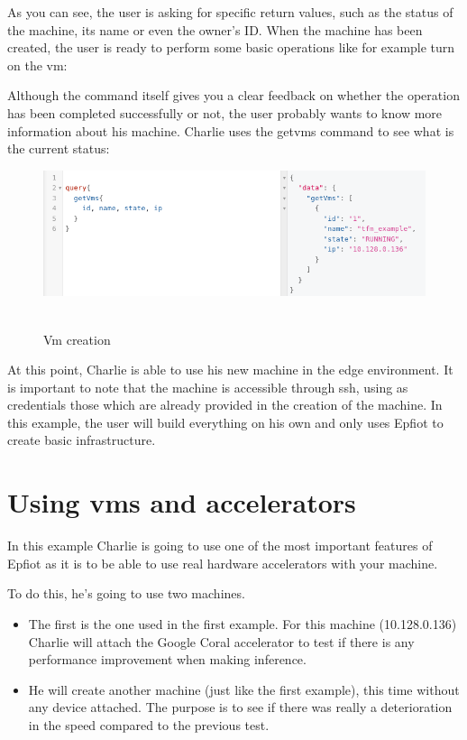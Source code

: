 As you can see, the user is asking for specific return values, such as the status of the machine, its name or even the owner's ID.
When the machine has been created, the user is ready to perform some basic operations like for example turn on the vm:


\noindent{}

Although the command itself gives you a clear feedback on whether the operation has been completed successfully or not, the user probably wants to know more information about his machine. Charlie uses the getvms command to see what is the current status:

\begin{figure}[h!]%
\centering
    \includegraphics[width=5.5in]{figures/get_vms.png}
~\caption{Vm creation}
\label{figure6.4}
\end{figure}

At this point, Charlie is able to use his new machine in the edge environment.  It is important to note that the machine is accessible through ssh, using as credentials those which are already provided in the creation of the machine. In this example, the user will build everything on his own and only uses Epfiot to create basic infrastructure.

\newpage
\section{Using vms and accelerators}
\label{makereference6.3}

In this example Charlie is going to use one of the most important features of Epfiot as it is to be able to use real hardware accelerators with your machine.

To do this, he's going to use two machines.


\begin{itemize}
    \item The first is the one used in the first example. For this machine (10.128.0.136) Charlie will attach the Google Coral accelerator to test if there is any performance improvement when making inference.
    \item He will create another machine (just like the first example), this time without any device attached. The purpose is to see if there was really a deterioration in the speed compared to the previous test.
\end{itemize}

